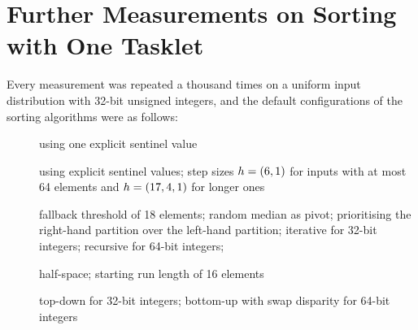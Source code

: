 \chapter{Further Measurements on Sorting with One Tasklet}
\label{apx:tasklet}

Every measurement was repeated a thousand times on a uniform input distribution with 32-bit unsigned integers, and the default configurations of the sorting algorithms were as follows:
\begin{description}
	\item[\IS{}]
	using one explicit sentinel value

	\item[\ShS{}]
	using explicit sentinel values;
	step sizes \(h = (6, 1)\) for inputs with at most 64 elements and \(h = (17, 4, 1)\) for longer ones

	\item[\QS{}]
	fallback threshold of 18 elements;
	random median as pivot;
	prioritising the right-hand partition over the left-hand partition;
	iterative for 32-bit integers;
	recursive for 64-bit integers;

	\item[\MS{}]
	half-space;
	starting run length of 16 elements

	\item[\HS{}]
	top-down for 32-bit integers;
	bottom-up with swap disparity for 64-bit integers
\end{description}

\clearpage


\clearpage


\clearpage


\clearpage


\clearpage


